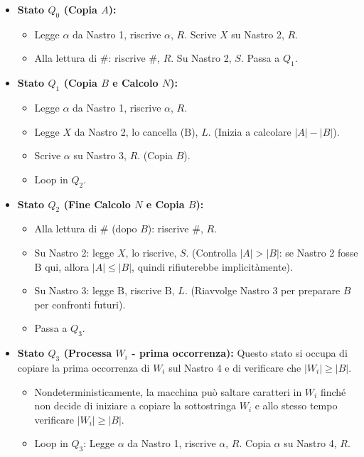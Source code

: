 \documentclass[a4paper]{article}
\newcommand{\B}{\text{B}} %
\begin{document}
\begin{itemize}
    \item \textbf{Stato $Q_0$ (Copia $A$):}
        \begin{itemize}
            \item Legge $\alpha$ da Nastro 1, riscrive $\alpha$, $R$. Scrive $X$ su Nastro 2, $R$.
            \item Alla lettura di $\#$: riscrive $\#$, $R$. Su Nastro 2, $S$. Passa a $Q_1$.
        \end{itemize}
    \item \textbf{Stato $Q_1$ (Copia $B$ e Calcolo $N$):}
        \begin{itemize}
            \item Legge $\alpha$ da Nastro 1, riscrive $\alpha$, $R$.
            \item Legge $X$ da Nastro 2, lo cancella ($\B$), $L$. (Inizia a calcolare $|A|-|B|$).
            \item Scrive $\alpha$ su Nastro 3, $R$. (Copia $B$).
            \item Loop in $Q_2$.
        \end{itemize}
    \item \textbf{Stato $Q_2$ (Fine Calcolo $N$ e Copia $B$):}
        \begin{itemize}
            \item Alla lettura di $\#$ (dopo $B$): riscrive $\#$, $R$.
            \item Su Nastro 2: legge $X$, lo riscrive, $S$. (Controlla $|A|>|B|$: se Nastro 2 fosse $\B$ qui, allora $|A| \le |B|$, quindi rifiuterebbe implicitàmente).
            \item Su Nastro 3: legge $\B$, riscrive $\B$, $L$. (Riavvolge Nastro 3 per preparare $B$ per confronti futuri).
            \item Passa a $Q_3$.
        \end{itemize}
    \item \textbf{Stato $Q_3$ (Processa $W_i$ - prima occorrenza):}
        Questo stato si occupa di copiare la prima occorrenza di $W_i$ sul Nastro 4 e di verificare che $|W_i| \ge |B|$.
        \begin{itemize}
            \item Nondeterministicamente, la macchina può saltare caratteri in $W_i$ finché non decide di iniziare a copiare la sottostringa $W_i$ e allo stesso tempo verificare $|W_i| \ge |B|$.
            \item Loop in $Q_3$: Legge $\alpha$ da Nastro 1, riscrive $\alpha$, $R$. Copia $\alpha$ su Nastro 4, $R$.

\end{itemize}
\end{itemize}
\end{document}
